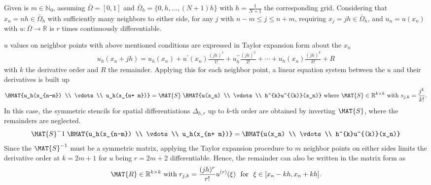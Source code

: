 \newcommand{\assignmentDate}{November 11th, 2019}



\newcommand{\Sk}{\MAT{S}}
Given is $m \in \mathbb{N}_0$, assuming $\bar{\Omega} = [0,1]$ and $\bar{\Omega}_h = \{0,h,\dots,(N+1)h\}$ with $h = \frac{1}{N + 1}$ the corresponding grid.
Considering that $x_n = nh \in \bar{\Omega}_h$ with sufficiently many neighbors to either side, for any $j$ with $n-m \leq j \leq n+m$, requiring $x_j = jh \in \bar{\Omega}_h $, and $u_n = u(x_n)$ with $u \colon \bar{\Omega} \rightarrow \mathbb{R}$ is $r$ times continuously differentiable.

%
$u$ values on neighbor points with above mentioned conditions are expressed in Taylor expansion form about the $x_n$
\begin{align}
	u_h(x_n + j h) = u_h(x_n) + u^\prime(x_n)\frac{(jh)^1}{1!} + u_h^{\prime\prime}\frac{(jh)^2}{2!} + \cdots + u_h(x_n) \frac{(jh)^k}{k!} + R
\end{align}
with $k$ the derivative order and $R$ the remainder.
Applying this for each neighbor point, a linear equation system between the $u$ and their derivatives is built up
\begin{equation}
	\BMAT{u_h(x_{n-m})     \\
		  \vdots 		   \\
		  u_h(x_{n+ m})}
	= \Sk \;
	\BMAT{u(x_n)     \\
		  \vdots 		   \\
		  h^{k}u^{(k)}(x_n)}
	\text{ where } \Sk \in \mathbb{R}^{k \times k} \text{ with } s_{j,k} = \frac{j^k}{k!} \text{.}
\end{equation}
In this case, the symmetric stencils for spatial differentiations $\Delta_{h,r}$ up to $k$-th order are obtained by inverting $\Sk$, where the remainders are neglected.
\begin{equation}
	\Sk^-1 \;
	\BMAT{u_h(x_{n-m})     \\
		  \vdots 		   \\
		  u_h(x_{n+ m})}
	=
	\BMAT{u(x_n)     \\
		  \vdots 		   \\
		  h^{k}u^{(k)}(x_n)}
\end{equation}
Since the $\Sk^{-1}$ must be a symmetric matrix, applying the Taylor expansion procedure to $m$ neighbor points on either sides limits the derivative order at $k=2m + 1$ for $u$ being $r=2m + 2$ differentiable.
Hence, the remainder can also be written in the matrix form as
\begin{equation}
	\MAT{R} \in \mathbb{R}^{k \times k} \text{ with } r_{j,k} = \frac{(jh)^{r}}{r!}u^{(r)}(\xi)$ \text{ for } $\xi \in [x_n -kh, x_n + kh]\text{.}
\end{equation}

